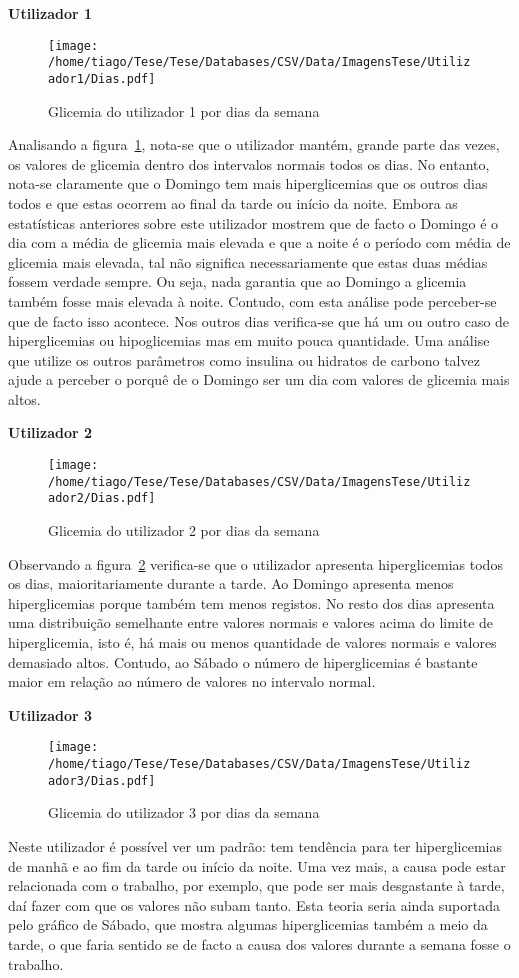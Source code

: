 \textbf{Utilizador 1}

\begin{figure}[H]
\centering
\texttt{[image: /home/tiago/Tese/Tese/Databases/CSV/Data/ImagensTese/Utilizador1/Dias.pdf]}
\caption{Glicemia do utilizador 1 por dias da semana}
\label{fig:dias1}
\end{figure}
Analisando a figura~\ref{fig:dias1}, nota-se que o utilizador mantém, grande parte das vezes, os valores de glicemia dentro dos intervalos normais todos os dias. No entanto, nota-se claramente que o Domingo tem mais hiperglicemias que os outros dias todos e que estas ocorrem ao final da tarde ou início da noite. Embora as estatísticas anteriores sobre este utilizador mostrem que de facto o Domingo é o dia com a média de glicemia mais elevada e que a noite é o período com média de glicemia mais elevada, tal não significa necessariamente que estas duas médias fossem verdade sempre. Ou seja, nada garantia que ao Domingo a glicemia também fosse mais elevada à noite. Contudo, com esta análise pode perceber-se que de facto isso acontece. Nos outros dias verifica-se que há um ou outro caso de hiperglicemias ou hipoglicemias mas em muito pouca quantidade. Uma análise que utilize os outros parâmetros como insulina ou hidratos de carbono talvez ajude a perceber o porquê de o Domingo ser um dia com valores de glicemia mais altos. 

\textbf{Utilizador 2}


\begin{figure}[H]
\centering
\texttt{[image: /home/tiago/Tese/Tese/Databases/CSV/Data/ImagensTese/Utilizador2/Dias.pdf]}
\caption{Glicemia do utilizador 2 por dias da semana}
\label{fig:dias2}
\end{figure}
Observando a figura~\ref{fig:dias2} verifica-se que o utilizador apresenta hiperglicemias todos os dias, maioritariamente durante a tarde. Ao Domingo apresenta menos hiperglicemias porque também tem menos registos. No resto dos dias apresenta uma distribuição semelhante entre valores normais e valores acima do limite de hiperglicemia, isto é, há mais ou menos quantidade de valores normais e valores demasiado altos. Contudo, ao Sábado o número de hiperglicemias é bastante maior em relação ao número de valores no intervalo normal.\newpage



\textbf{Utilizador 3}

\begin{figure}[H]
\centering
\texttt{[image: /home/tiago/Tese/Tese/Databases/CSV/Data/ImagensTese/Utilizador3/Dias.pdf]}
\caption{Glicemia do utilizador 3 por dias da semana}
\label{fig:dias3}
\end{figure}
Neste utilizador é possível ver um padrão: tem tendência para ter hiperglicemias de manhã e ao fim da tarde ou início da noite. Uma vez mais, a causa pode estar relacionada com o trabalho, por exemplo, que pode ser mais desgastante à tarde, daí fazer com que os valores não subam tanto. Esta teoria seria ainda suportada pelo gráfico de Sábado, que mostra algumas hiperglicemias também a meio da tarde, o que faria sentido se de facto a causa dos valores durante a semana fosse o trabalho.\newpage

